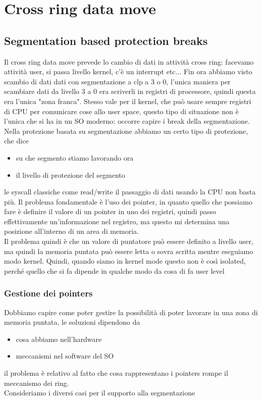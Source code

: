 \documentclass[12pt, oneside]{extbook}
\begin{document}
\chapter{Cross ring data move}
\section{Segmentation based protection breaks}
Il cross ring data move prevede lo cambio di dati in attività cross ring: facevamo attività user, si passa livello kernel, c'è un interrupt etc... Fin ora abbiamo visto scambio di dati dati con segmentazione a clp a 3 o 0, l'unica maniera per scambiare dati da livello 3 a 0 era scriverli in registri di processore, quindi questa era l'unica "zona franca". Stesso vale per il kernel, che può usare sempre registri di CPU per comunicare cose allo user space, questo tipo di situazione non è l'unica che si ha in un SO moderno: occorre capire i break della segmentazione. Nella protezione basata su segmentazione abbiamo un certo tipo di protezione, che dice 
\begin{itemize}
\item su che segmento stiamo lavorando ora 
\item il livello di protezione del segmento
\end{itemize}
le syscall classiche come read/write il passaggio di dati usando la CPU non basta più. Il problema fondamentale è l'uso dei pointer, in quanto quello che possiamo fare è definire il valore di un pointer in uno dei registri, quindi passo effettivamente un'informazione nel registro, ma questo mi determina una posizione all'interno di un area di memoria.\\Il problema quindi è che un valore di puntatore può essere definito a livello user, ma quindi la memoria puntata può essere letta o sovra scritta mentre eseguiamo modo kernel. Quindi, quando siamo in kernel mode questo non è così isolated, perché quello che si fa dipende in qualche modo da cosa di fa user level
\subsection{Gestione dei pointers}
Dobbiamo capire come poter gestire la possibilità di poter lavorare in una zona di memoria puntata, le soluzioni dipendono da 
\begin{itemize}
\item cosa abbiamo nell'hardware
\item meccanismi nel software del SO
\end{itemize}
il problema è relativo al fatto che cosa rappresentano i pointers rompe il meccanismo dei ring.\\Consideriamo i diversi casi per il supporto alla segmentazione
\end{document}
